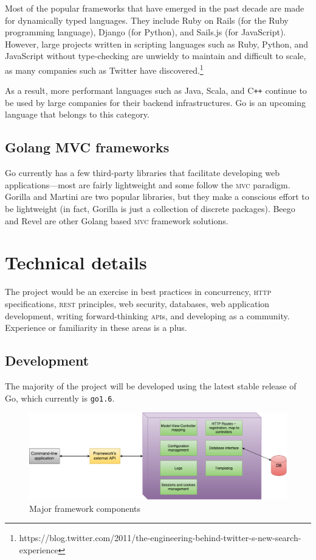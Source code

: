 \documentclass{article}
\begin{document}
Most of the popular frameworks that have emerged in the past decade are made for dynamically typed languages. They include Ruby on Rails (for the Ruby programming language), Django (for Python), and Sails.js (for JavaScript). However, large projects written in scripting languages such as Ruby, Python, and JavaScript without type-checking are unwieldy to maintain and difficult to scale, as many companies such as Twitter have discovered.\footnote{{https://blog.twitter.com/2011/the-engineering-behind-twitter-s-new-search-experience}}

As a result, more performant languages such as Java, Scala, and C\texttt{++} continue to be used by large companies for their backend infrastructures. Go is an upcoming language that belongs to this category.

\subsection{Golang MVC frameworks}

Go currently has a few third-party libraries that facilitate developing web applications---most are fairly lightweight and some follow the \textsc{mvc} paradigm. Gorilla and Martini are two popular libraries, but they make a conscious effort to be lightweight (in fact, Gorilla is just a collection of discrete packages). Beego and Revel are other Golang based \textsc{mvc} framework solutions. 

\section{Technical details}

The project would be an exercise in best practices in concurrency, \textsc{http} specifications, \textsc{rest} principles, web security, databases, web application development, writing forward-thinking \textsc{api}s, and developing as a community. Experience or familiarity in these areas is a plus.

\subsection{Development}

The majority of the project will be developed using the latest stable release of Go, which currently is \texttt{go1.6}. 

\begin{figure}[h]
\centering
\includegraphics[width=1.1\textwidth]{mvc-app.pdf}
\caption{Major framework components }
\end{figure}
\end{document}
